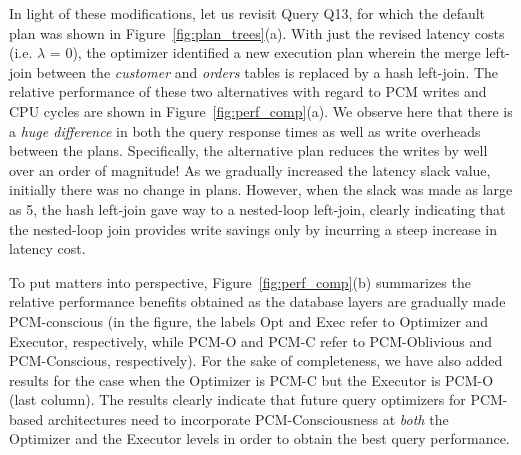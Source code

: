 \documentclass{article}
\begin{document}
In light of these modifications, let us revisit Query Q13, for which the
default plan was shown in Figure~\ref{fig:plan_trees}(a). With just the revised
latency costs (i.e. $\lambda$ = 0), the optimizer identified a new execution
plan wherein the merge left-join between the \textit{customer} and
\textit{orders} tables is replaced by a hash left-join.  The relative
performance of these two alternatives with regard to PCM writes and CPU cycles
are shown in Figure~\ref{fig:perf_comp}(a). We observe here that there is a
\emph{huge difference} in both the query response times as well as write
overheads between the plans.  Specifically, the alternative plan reduces the
writes by well over an order of magnitude!  As we gradually increased the
latency slack value, initially there was no change in plans. However, when the
slack was made as large as 5, the hash left-join gave way to a nested-loop
left-join, clearly indicating that the nested-loop join provides write savings
only by incurring a steep increase in latency cost.


To put matters into perspective, Figure~\ref{fig:perf_comp}(b) summarizes the
relative performance benefits obtained as the database layers are gradually
made PCM-conscious (in the figure, the labels Opt and Exec refer to Optimizer
and Executor, respectively, while PCM-O and PCM-C refer to PCM-Oblivious and
PCM-Conscious, respectively). For the sake of completeness, we have also added
results for the case when the Optimizer is PCM-C but the Executor is PCM-O
(last column). The results clearly indicate that future query optimizers for
PCM-based architectures need to incorporate PCM-Consciousness at \emph{both}
the Optimizer and the Executor levels in order to obtain the best query
performance. 
\end{document}
